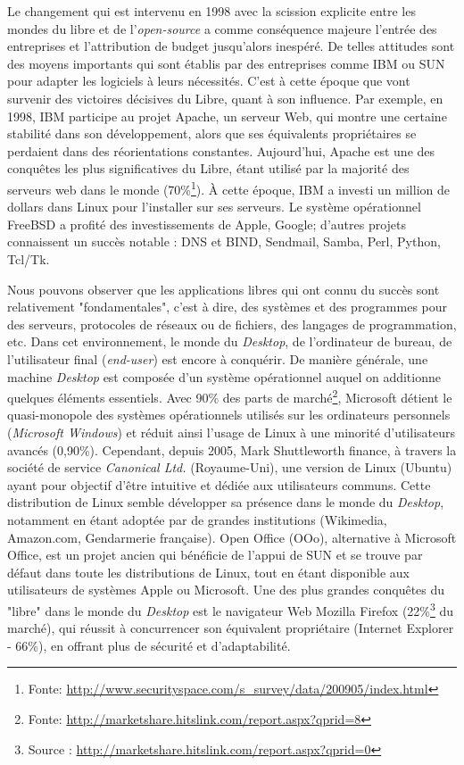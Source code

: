 Le changement qui est intervenu en 1998 avec la scission explicite entre les mondes du libre et de l'\emph{open-source} a comme conséquence majeure l'entrée des entreprises et l'attribution de budget jusqu'alors inespéré. De telles attitudes sont des moyens importants qui sont établis par des entreprises comme IBM ou SUN pour adapter les logiciels à leurs nécessités. C'est à cette époque que vont survenir des victoires décisives du Libre, quant à son influence. Par exemple, en 1998, IBM participe au projet Apache, un serveur Web, qui montre une certaine stabilité dans son développement, alors que ses équivalents propriétaires se perdaient dans des réorientations constantes. Aujourd'hui, Apache est une des conquêtes les plus significatives du Libre, étant utilisé par la majorité des serveurs web dans le monde (70\%\footnote{Fonte: \url{http://www.securityspace.com/s_survey/data/200905/index.html}}). \`A cette époque, IBM a investi un million de dollars dans Linux pour l'installer sur ses serveurs. Le système opérationnel FreeBSD a profité des investissements de Apple, Google; d'autres projets connaissent un succès notable : DNS et BIND, Sendmail, Samba, Perl, Python, Tcl/Tk.

Nous pouvons observer que les applications libres qui ont connu du succès sont relativement "fondamentales", c'est à dire, des systèmes et des programmes pour des serveurs, protocoles de réseaux ou de fichiers, des langages de programmation, etc. Dans cet environnement, le monde du \emph{Desktop}, de l'ordinateur de bureau, de l'utilisateur final (\emph{end-user}) est  encore à conquérir. De manière générale, une machine \emph{Desktop} est composée d'un système opérationnel auquel on additionne quelques éléments essentiels. Avec 90\% des parts de marché\footnote{Fonte: \url{http://marketshare.hitslink.com/report.aspx?qprid=8}}, Microsoft détient le quasi-monopole des systèmes opérationnels utilisés sur les ordinateurs personnels (\emph{Microsoft Windows}) et réduit ainsi l'usage de Linux à une minorité d'utilisateurs avancés (0,90\%). Cependant, depuis 2005, Mark Shuttleworth finance, à travers la société de service \emph{Canonical Ltd.} (Royaume-Uni), une version de Linux (Ubuntu) ayant pour objectif d'être intuitive et dédiée aux utilisateurs communs. Cette distribution de Linux semble développer sa présence dans le monde du \emph{Desktop}, notamment en étant adoptée par de grandes institutions (Wikimedia, Amazon.com, Gendarmerie française). Open Office (OOo), alternative à Microsoft Office, est un projet ancien qui bénéficie de l'appui de SUN et se trouve par défaut dans toute les distributions de Linux, tout en étant disponible aux utilisateurs de systèmes Apple ou Microsoft. Une des plus grandes conquêtes du "libre" dans le monde du \emph{Desktop} est le navigateur Web Mozilla Firefox (22\%\footnote{Source : \url{http://marketshare.hitslink.com/report.aspx?qprid=0}} du marché), qui réussit à concurrencer son équivalent propriétaire (Internet Explorer - 66\%), en offrant plus de sécurité et d'adaptabilité.

